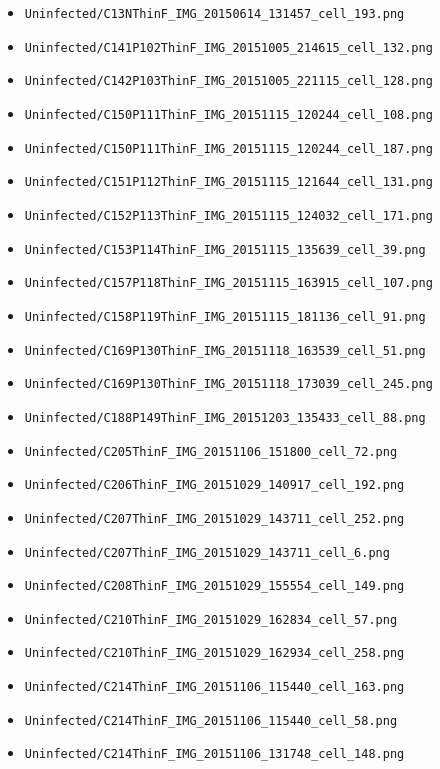 \begin{itemize}
\item \texttt{Uninfected/C13NThinF\_IMG\_20150614\_131457\_cell\_193.png}
\item \texttt{Uninfected/C141P102ThinF\_IMG\_20151005\_214615\_cell\_132.png}
\item \texttt{Uninfected/C142P103ThinF\_IMG\_20151005\_221115\_cell\_128.png}
\item \texttt{Uninfected/C150P111ThinF\_IMG\_20151115\_120244\_cell\_108.png}
\item \texttt{Uninfected/C150P111ThinF\_IMG\_20151115\_120244\_cell\_187.png}
\item \texttt{Uninfected/C151P112ThinF\_IMG\_20151115\_121644\_cell\_131.png}
\item \texttt{Uninfected/C152P113ThinF\_IMG\_20151115\_124032\_cell\_171.png}
\item \texttt{Uninfected/C153P114ThinF\_IMG\_20151115\_135639\_cell\_39.png}
\item \texttt{Uninfected/C157P118ThinF\_IMG\_20151115\_163915\_cell\_107.png}
\item \texttt{Uninfected/C158P119ThinF\_IMG\_20151115\_181136\_cell\_91.png}
\item \texttt{Uninfected/C169P130ThinF\_IMG\_20151118\_163539\_cell\_51.png}
\item \texttt{Uninfected/C169P130ThinF\_IMG\_20151118\_173039\_cell\_245.png}
\item \texttt{Uninfected/C188P149ThinF\_IMG\_20151203\_135433\_cell\_88.png}
\item \texttt{Uninfected/C205ThinF\_IMG\_20151106\_151800\_cell\_72.png}
\item \texttt{Uninfected/C206ThinF\_IMG\_20151029\_140917\_cell\_192.png}
\item \texttt{Uninfected/C207ThinF\_IMG\_20151029\_143711\_cell\_252.png}
\item \texttt{Uninfected/C207ThinF\_IMG\_20151029\_143711\_cell\_6.png}
\item \texttt{Uninfected/C208ThinF\_IMG\_20151029\_155554\_cell\_149.png}
\item \texttt{Uninfected/C210ThinF\_IMG\_20151029\_162834\_cell\_57.png}
\item \texttt{Uninfected/C210ThinF\_IMG\_20151029\_162934\_cell\_258.png}
\item \texttt{Uninfected/C214ThinF\_IMG\_20151106\_115440\_cell\_163.png}
\item \texttt{Uninfected/C214ThinF\_IMG\_20151106\_115440\_cell\_58.png}
\item \texttt{Uninfected/C214ThinF\_IMG\_20151106\_131748\_cell\_148.png}

\end{itemize}
